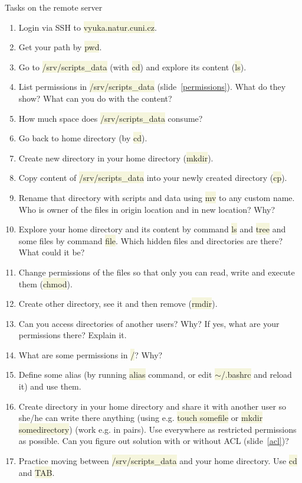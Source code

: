 \documentclass[compress, xelatex, 11pt, xcolor=svgnames, aspectratio=169, url={hyphens, lowtilde}]{beamer}
\renewcommand{\texttt}[1]{\colorbox{Beige}{{\ttfamily #1}}}
\begin{document}
\begin{frame}[allowframebreaks]{Tasks on the remote server}
	\begin{enumerate}
		\item Login via SSH to \texttt{vyuka.natur.cuni.cz}.
		\item Get your path by \texttt{pwd}.
		\item Go to \texttt{/srv/scripts\_data} (with \texttt{cd}) and explore its content (\texttt{ls}).
		\item List permissions in \texttt{/srv/scripts\_data} (slide~\ref{permissions}). What do they show? What can you do with the content?
		\item How much space does \texttt{/srv/scripts\_data} consume?
		\item Go back to home directory (by \texttt{cd}).
		\item Create new directory in your home directory (\texttt{mkdir}).
		\item Copy content of \texttt{/srv/scripts\_data} into your newly created directory (\texttt{cp}).
		\item Rename that directory with scripts and data using \texttt{mv} to any custom name. Who is owner of the files in origin location and in new location? Why?
		\item Explore your home directory and its content by command \texttt{ls} and \texttt{tree} and some files by command \texttt{file}. Which hidden files and directories are there? What could it be?
		\item Change permissions of the files so that only you can read, write and execute them (\texttt{chmod}).
		\item Create other directory, see it and then remove (\texttt{rmdir}).
		\item Can you access directories of another users? Why? If yes, what are your permissions there? Explain it.
		\item What are some permissions in \texttt{/}? Why?
		\item Define some alias (by running \texttt{alias} command, or edit \texttt{$\sim$/.bashrc} and reload it) and use them.
		\item Create directory in your home directory and share it with another user so she/he can write there anything (using e.g. \texttt{touch somefile} or \texttt{mkdir somedirectory}) (work e.g. in pairs). Use everywhere as restricted permissions as possible. Can you figure out solution with or without ACL (slide~\ref{acl})?
		\item Practice moving between \texttt{/srv/scripts\_data} and your home directory. Use \texttt{cd} and \texttt{TAB}.

\end{enumerate}
\end{frame}
\end{document}
